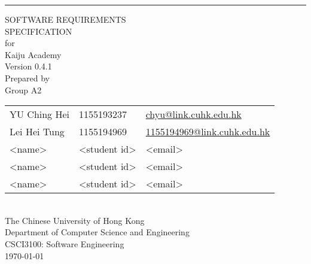 \documentclass[a4paper, 11pt]{scrreprt}
\date{}
\def\myversion{0.4.1}
\def\projectname{Kaiju Academy}
\begin{document}

\begin{titlepage}
    \begin{flushright}
        \rule{\textwidth}{5pt}\vskip1cm
        \begin{bfseries}
            \Huge{SOFTWARE REQUIREMENTS\\ SPECIFICATION}\\
            \vspace{1.6cm}
            for\\
            \vspace{1.6cm}
            \projectname\\  %
            \vspace{1.6cm}
            \LARGE{Version \myversion}\\
            \vspace{1.6cm}
            Prepared by\\
            Group A2\\
            \begin{tabularx}{\textwidth}{l l >{\raggedleft\arraybackslash}X}
            YU Ching Hei & 1155193237 & \href{mailto:chyu@link.cuhk.edu.hk}{chyu@link.cuhk.edu.hk}\\
            Lei Hei Tung & 1155194969 & \href{mailto:1155194969@link.cuhk.edu.hk}{1155194969@link.cuhk.edu.hk}\\
            <name> & <student id> & <email>\\
            <name> & <student id> & <email>\\
            <name> & <student id> & <email>\\
            \end{tabularx}\\
            \vspace{1.6cm}
            The Chinese University of Hong Kong\\
            Department of Computer Science and Engineering\\
            CSCI3100: Software Engineering\\
            \vspace{1.6cm}
            \today\\
        \end{bfseries}
    \end{flushright}
\end{titlepage}

\tableofcontents
\end{document}
